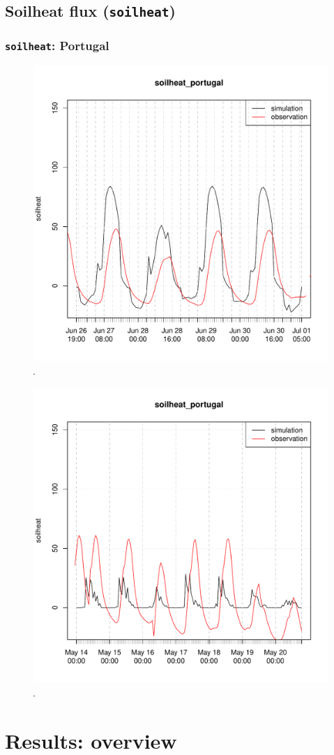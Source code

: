 \documentclass{scrreprt}
\begin{document}
\newpage
\section{Soilheat flux (\texttt{soilheat})}

\subsection{\texttt{soilheat}: Portugal}

\begin{figure}[ht]
  \centering
  \includegraphics[width=0.5\hsize]{./plot_soilheat_compare_portugal_HS_2014-06-26_2014-07-01.pdf}
  \caption{.}
  \label{fig:portugal_HS_soilheat1}
\end{figure}

\begin{figure}[ht]
  \centering
  \includegraphics[width=0.5\hsize]{./plot_soilheat_compare_portugal_NSA_2014-05-13_2014-05-20.pdf}
  \caption{.}
  \label{fig:portugal_NSA_soilheat1}
\end{figure}



\chapter{Results: overview} \label{ch:results}
\end{document}
